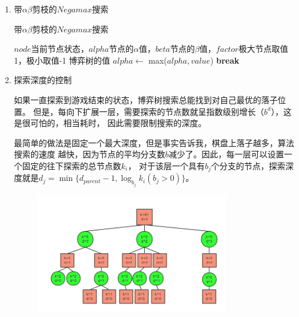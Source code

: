 \documentclass[10pt,letterpaper]{ctexart}
\begin{document}
\begin{enumerate}[itemindent=2.5em,label=\arabic*、]
    \item 带$\alpha \beta$剪枝的$Negamax$搜索
    \begin{algorithm}
      \caption{带$\alpha \beta$剪枝的$Negamax$搜索}
        \begin{algorithmic}[1] %
          \Require $node$当前节点状态，$alpha$节点的$\alpha$值，$beta$节点的$\beta$值，$factor$极大节点取值1，极小取值-1
          \Ensure 博弈树的值
                \State $alpha \gets$ max($alpha, value$)
                  \State \textbf{break}
                \EndIf
              \EndFor
              \State {}
            \EndFunction
        \end{algorithmic}
    \end{algorithm}
    \item 探索深度的控制
    \par \qquad 如果一直探索到游戏结束的状态，博弈树搜索总能找到对自己最优的落子位置。
    但是，每向下扩展一层，需要探索的节点数就呈指数级别增长（$b^d$），这是很可怕的，相当耗时，
    因此需要限制搜索的深度。
    \par \qquad 最简单的做法是固定一个最大深度，但是事实告诉我，棋盘上落子越多，算法搜索的速度
    越快，因为节点的平均分支数$b$减少了。因此，每一层可以设置一个固定的往下探索的总节点数$k_i$，
    对于该层一个具有$b_j$个分支的节点，探索深度就是$d_j = \min\{d_{parent} - 1, \log_{b_j}k_i(b_j > 0)\}$。
    \begin{figure}[H]
      \centering
      \includegraphics[width=0.8\textwidth]{depth.PNG}

\end{figure}
\end{enumerate}
\end{document}
